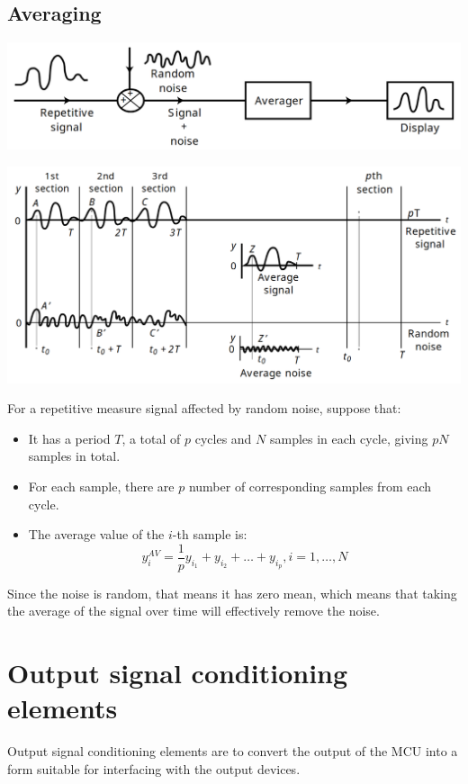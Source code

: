 \documentclass[11pt]{article}
\begin{document}
 \newpage
\subsection{Averaging}
\label{sec:orga1ba016}
\begin{center}
\includegraphics[width=.9\linewidth]{./images/averaging-diagram.png}
\end{center}
\begin{center}
\includegraphics[width=.9\linewidth]{./images/averaging-detailed-diagram.png}
\end{center}
For a repetitive measure signal affected by random noise, suppose that:
\begin{itemize}
\item It has a period \(T\), a total of \(p\) cycles and \(N\) samples in each cycle, giving \(pN\) samples in total.
\item For each sample, there are \(p\) number of corresponding samples from each cycle.
\item The average value of the \(i\)-th sample is:
\[y_i^{AV} = \frac{1}{p} y_{i_1} + y_{i_2} + \ldots + y_{i_p}, i = 1, \ldots, N\]
\end{itemize}

Since the noise is random, that means it has zero mean, which means that taking the average of the signal over time will effectively remove the noise.

 \newpage
\section{Output signal conditioning elements}
\label{sec:org0fc376b}
Output signal conditioning elements are to convert the output of the MCU into a form suitable for interfacing with the output devices.
\end{document}
